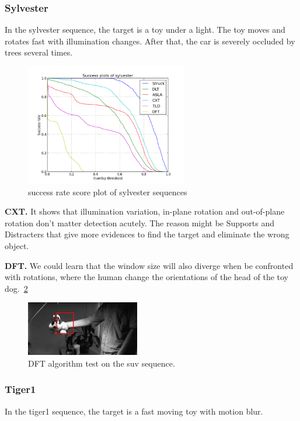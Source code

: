 \documentclass{acm_proc_article-sp}
\begin{document}
\subsubsection{Sylvester}

In the sylvester sequence, the target is a toy under a light. The toy moves and rotates fast with illumination changes. After that, the car is severely occluded by trees several times.

\begin{figure}[hbt]
	\centering
    \includegraphics[width=200pt]{sylvester}
    \caption{success rate score plot of sylvester sequences}
    \label{fig:sylvester}
\end{figure}

\textbf{CXT.} It shows that illumination variation, in-plane rotation and out-of-plane rotation don't matter detection acutely. The reason might be Supports and Distracters that give more evidences to find the target and eliminate the wrong object.

\textbf{DFT.} We could learn that the window size will also diverge when be confronted with rotations, where the human change the orientations of the head of the toy dog.~\ref{fig:dtf_sylvester}
\begin{figure}[hbt]
	\centering
    \includegraphics[width=140pt]{dtf_sylvester}
    \caption{DFT algorithm test on the suv sequence.}
    \label{fig:dtf_sylvester}
\end{figure}

\subsubsection{Tiger1}

In the tiger1 sequence, the target is a fast moving toy with motion blur.
\end{document}
